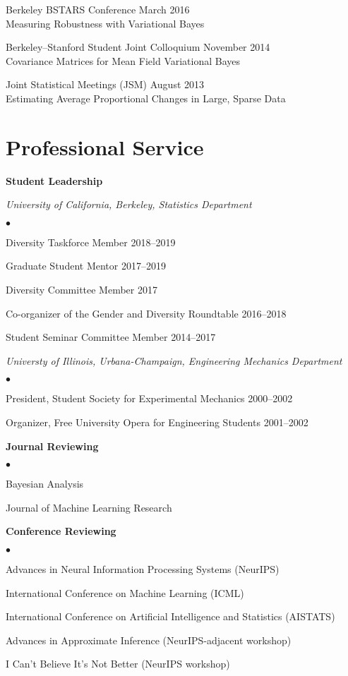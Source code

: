 \documentclass[margin,line]{res}
\newenvironment{list2}{
  \begin{list}{$\bullet$}{%
      \setlength{\itemsep}{0in}
      \setlength{\parsep}{0in} \setlength{\parskip}{0in}
      \setlength{\topsep}{0in} \setlength{\partopsep}{0in}
      \setlength{\leftmargin}{0.2in}}}{\end{list}}
\begin{document}
\begin{resume}
Berkeley BSTARS Conference \hfill March 2016\\
Measuring Robustness with Variational Bayes

Berkeley--Stanford Student Joint Colloquium \hfill November 2014\\
Covariance Matrices for Mean Field Variational Bayes

Joint Statistical Meetings (JSM) \hfill August 2013\\
Estimating Average Proportional Changes in Large, Sparse Data


\section{\sc Professional Service}

\textbf{Student Leadership}

{\em University of California, Berkeley, Statistics Department}
\begin{list2}
    \item Diversity Taskforce Member \hfill 2018--2019
    \item Graduate Student Mentor \hfill 2017--2019
    \item Diversity Committee Member  \hfill 2017
    \item Co-organizer of the Gender and Diversity Roundtable \hfill 2016--2018
    \item Student Seminar Committee Member \hfill 2014--2017
\end{list2}

{\em Universty of Illinois, Urbana-Champaign, Engineering Mechanics Department}
\begin{list2}
    \item President, Student Society for Experimental Mechanics \hfill 2000--2002
    \item Organizer, Free University Opera for Engineering Students \hfill 2001--2002
\end{list2}


\textbf{Journal Reviewing}
\begin{list2}
\item Bayesian Analysis
\item Journal of Machine Learning Research
\end{list2}

\textbf{Conference Reviewing}
\begin{list2}
\item Advances in Neural Information Processing Systems (NeurIPS)
\item International Conference on Machine Learning (ICML)
\item International Conference on Artificial Intelligence and Statistics (AISTATS)
\item Advances in Approximate Inference (NeurIPS-adjacent workshop)
\item I Can't Believe It's Not Better (NeurIPS workshop)
\end{list2}



\end{resume}
\end{document}
